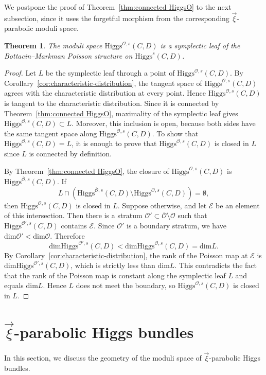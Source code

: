 \documentclass[11pt]{amsart}
\theoremstyle{plain}
\newtheorem{theorem}{Theorem}[section]
\theoremstyle{definition}
\theoremstyle{remark}
\newcommand{\ov}[1]{\overline{#1}}
\newcommand{\cO}{\mathcal O}
\newcommand{\Higgs}{\mathrm{Higgs}}
\def\dim{\mathrm{dim}}
\def\vxi{\vec{\xi}}
\begin{document}
We postpone the proof of Theorem~\ref{thm:connected HiggsO} to the next subsection, since it uses the forgetful morphism from the corresponding $\vec\xi$-parabolic moduli space.

\begin{theorem}\label{thm:orbit-stratum-is-leaf}
	The moduli space $\Higgs^{\cO,s}(C,D)$ is a symplectic leaf of the Bottacin--Markman Poisson structure on $\Higgs^s(C,D)$.
\end{theorem}
\begin{proof}
	Let $L$ be the symplectic leaf through a point of $\Higgs^{\cO,s}(C,D)$. By Corollary~\ref{cor:characteristic-distribution}, the tangent space of $\Higgs^{\cO,s}(C,D)$ agrees with the characteristic distribution at every point. Hence $\Higgs^{\cO,s}(C,D)$ is tangent to the characteristic distribution. Since it is connected by Theorem~\ref{thm:connected HiggsO}, maximality of the symplectic leaf gives $\Higgs^{\cO,s}(C,D)\subset L$. Moreover, this inclusion is open, because both sides have the same tangent space along $\Higgs^{\cO,s}(C,D)$. To show that $\Higgs^{\cO,s}(C,D)=L$, it is enough to prove that $\Higgs^{\cO,s}(C,D)$ is closed in $L$ since $L$ is connected by definition.

By Theorem~\ref{thm:connected HiggsO}, the closure of $\Higgs^{\cO,s}(C,D)$ is $\Higgs^{\ov\cO,s}(C,D)$. If
\[
L\cap\left(\Higgs^{\ov\cO,s}(C,D)\setminus \Higgs^{\cO,s}(C,D)\right)=\emptyset,
\]
then $\Higgs^{\cO,s}(C,D)$ is closed in $L$. Suppose otherwise, and let $\mathcal E$ be an element of this intersection. Then there is a stratum $\cO'\subset \ov\cO\setminus\cO$ such that $\Higgs^{\cO',s}(C,D)$ contains $\mathcal E$. Since $\cO'$ is a boundary stratum, we have $\dim\cO'<\dim\cO$. Therefore
\[
\dim \Higgs^{\cO',s}(C,D)<\dim \Higgs^{\cO,s}(C,D)=\dim L.
\]
By Corollary~\ref{cor:characteristic-distribution}, the rank of the Poisson map at $\mathcal E$ is $\dim \Higgs^{\cO',s}(C,D)$, which is strictly less than $\dim L$. This contradicts the fact that the rank of the Poisson map is constant along the symplectic leaf $L$ and equals $\dim L$. Hence $L$ does not meet the boundary, so $\Higgs^{\cO,s}(C,D)$ is closed in $L$.
\end{proof}

\section{$\vec\xi$-parabolic Higgs bundles}\label{sec:xi-parabolic}
In this section, we discuss the geometry of the moduli space of $\vxi$-parabolic Higgs bundles.
\end{document}
